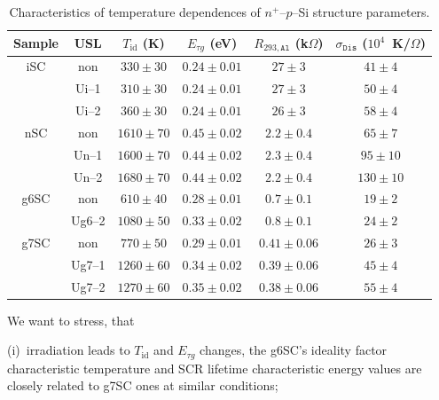 \documentclass[aip,jap, amsmath,amssymb,reprint]{revtex4-1}
\begin{document}
\begin{table}
\caption{\label{tabTpar}Characteristics of temperature dependences of $n^+$--$p$--Si structure parameters.
}
\begin{ruledtabular}
\begin{tabular}{cccccc}
Sample&USL&$T_{\mathrm{id}}$ (K)&$E_{\tau g}$ (eV)&$R_{293,\mathtt{Al}}$ (k$\Omega$)&$\sigma_{\mathtt{Dis}}$ ($10^4$~K/$\Omega$)\\
\hline
iSC&non&$330\pm30$&$0.24\pm0.01$&$27\pm3$&$41\pm4$\\
&Ui--1&$310\pm30$&$0.24\pm0.01$&$27\pm3$&$50\pm4$\\
&Ui--2&$360\pm30$&$0.24\pm0.01$&$26\pm3$&$58\pm4$\\
nSC&non&$1610\pm70$&$0.45\pm0.02$&$2.2\pm0.4$&$65\pm7$\\
&Un--1&$1600\pm70$&$0.44\pm0.02$&$2.3\pm0.4$&$95\pm10$\\
&Un--2&$1680\pm70$&$0.44\pm0.02$&$2.2\pm0.4$&$130\pm10$\\
g6SC&non&$610\pm40$&$0.28\pm0.01$&$0.7\pm0.1$&$19\pm2$\\
&Ug6--2&$1080\pm50$&$0.33\pm0.02$&$0.8\pm0.1$&$24\pm2$\\
g7SC&non&$770\pm50$&$0.29\pm0.01$&$0.41\pm0.06$&$26\pm3$\\
&Ug7--1&$1260\pm60$&$0.34\pm0.02$&$0.39\pm0.06$&$45\pm4$\\
&Ug7--2&$1270\pm60$&$0.35\pm0.02$&$0.38\pm0.06$&$55\pm4$\\
\end{tabular}
\end{ruledtabular}
\end{table}

We want to stress, that

\noindent
(i)~irradiation leads to $T_{\mathrm{id}}$ and $E_{\tau g}$ changes, the g6SC's ideality factor characteristic temperature and SCR lifetime characteristic energy values are closely related to g7SC ones at similar conditions;
\end{document}
